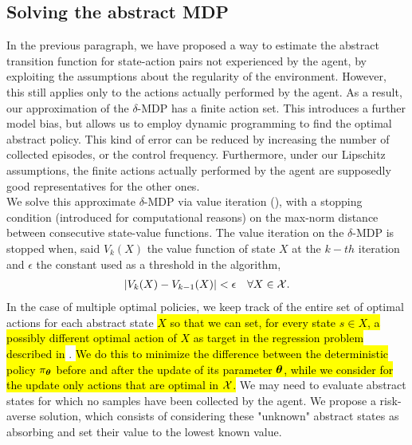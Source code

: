 \subsection{Solving the abstract MDP}
In the previous paragraph, we have proposed a way to estimate the abstract transition function for state-action pairs not experienced by the agent, by exploiting the assumptions about the regularity of the environment. However, this still applies only to the actions actually performed by the agent. As a result, our approximation of the $\delta$-\ac{MDP} has a finite action set. This introduces a further model bias, but allows us to employ dynamic programming to find the optimal abstract policy. This kind of error can be reduced by increasing the number of collected episodes, or the control frequency. Furthermore, under our Lipschitz assumptions, the finite actions actually performed by the agent are supposedly good representatives for the other ones.\\
\newline
We solve this approximate $\delta$-\ac{MDP} via value iteration (), with a stopping condition (introduced for computational reasons) on the max-norm distance between consecutive state-value functions.
The value iteration on the $\delta$-\ac{MDP} is stopped when, said $V_k(X)$ the value function of state $X$ at the $k-th$ iteration and $\epsilon$ the constant used as a threshold in the algorithm, 
\begin{align}
|V_k(X) - V_{k-1}(X)| < \epsilon \quad \forall X \in \mathcal{X}.
\end{align}
In the case of multiple optimal policies, we keep track of the entire set of optimal actions for each abstract state \hl{$X$ so that we can set, for every state $s \in X$, a possibly different optimal action of $X$ as target in the regression problem described in} . \hl{We do this to minimize the difference between the deterministic policy $\pi_{\boldsymbol{\theta}}$ before and after the update of its parameter $\boldsymbol{\theta}$, while we consider for the update only actions that are optimal in $\mathcal{X}$.}
We may need to evaluate abstract states for which no samples have been collected by the agent. We propose a risk-averse solution, which consists of considering these "unknown" abstract states as absorbing and set their value to the lowest known value. 

